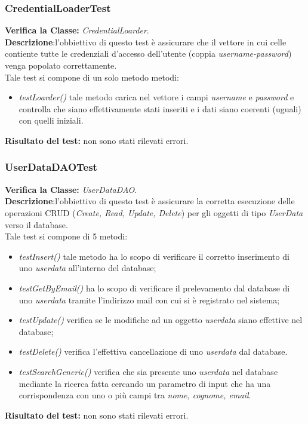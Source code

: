 \subsubsection{CredentialLoaderTest}
\textbf{Verifica la Classe:} \textit{CredentialLoarder}.\\
\textbf{Descrizione}:l'obbiettivo di questo test è assicurare che il vettore in cui celle contiente tutte le credenziali d'accesso dell'utente (coppia \textit{username-password}) venga popolato correttamente.\\
Tale test si compone di un solo metodo metodi:
\begin{itemize}
\item \textit{testLoarder() } tale metodo carica nel vettore i campi \textit{username} e \textit{password} e controlla che siano effettivamente stati inseriti e i dati siano coerenti (uguali) con quelli iniziali.
\end{itemize}
\textbf{Risultato del test:} non sono stati rilevati errori.


\subsubsection{UserDataDAOTest}
\textbf{Verifica la Classe:} \textit{UserDataDAO}.\\
\textbf{Descrizione}:l'obbiettivo di questo test è assicurare la corretta esecuzione delle operazioni CRUD (\textit{Create, Read, Update, Delete}) per gli oggetti di tipo \textit{UserData} verso il database. \\
Tale test si compone di 5 metodi:
\begin{itemize}
\item \textit{testInsert()} tale metodo ha lo scopo di verificare il corretto inserimento di uno \textit{userdata} all'interno del database;
\item \textit{testGetByEmail()} ha lo scopo di verificare il prelevamento dal database di uno \textit{userdata} tramite l'indirizzo mail con cui si è registrato nel sistema;
\item \textit{testUpdate() } verifica se le modifiche ad un oggetto \textit{userdata} siano effettive nel database;
\item \textit{testDelete() } verifica l'effettiva cancellazione di uno \textit{userdata} dal database.
\item \textit{testSearchGeneric()} verifica che sia presente uno \textit{userdata} nel database mediante la ricerca fatta cercando un parametro di input che ha una corrispondenza con uno o più campi tra \textit{nome, cognome, email}.
\end{itemize}
\textbf{Risultato del test:} non sono stati rilevati errori.


